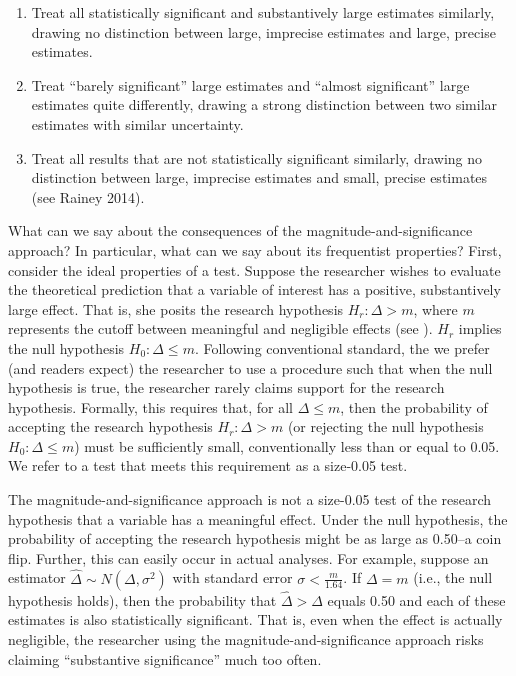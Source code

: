 \documentclass[12pt]{article}
\begin{document}
\begin{enumerate}
\item Treat all statistically significant and substantively large estimates similarly, drawing no distinction between large, imprecise estimates and large, precise estimates.
\item Treat ``barely significant'' large estimates and ``almost significant'' large estimates quite differently, drawing a strong distinction between two similar estimates with similar uncertainty.
\item Treat all results that are not statistically significant similarly, drawing no distinction between large, imprecise estimates and small, precise estimates (see Rainey 2014).
\end{enumerate}

What can we say about the consequences of the magnitude-and-significance approach? In particular, what can we say about its frequentist properties? First, consider the ideal properties of a test. Suppose the researcher wishes to evaluate the theoretical prediction that a variable of interest has a positive, substantively large effect. That is, she posits the research hypothesis $H_r: \Delta > m$, where $m$ represents the cutoff between meaningful and negligible effects (see \citealt{Rainey2014a}). $H_r$ implies the null hypothesis $H_0: \Delta \leq m$. Following conventional standard, the we prefer (and readers expect) the researcher to use a procedure such that when the null hypothesis is true, the researcher rarely claims support for the research hypothesis. Formally, this requires that, for all $\Delta \leq m$, then the probability of accepting the research hypothesis $H_r: \Delta > m$ (or rejecting the null hypothesis $H_0: \Delta \leq m$) must be sufficiently small, conventionally less than or equal to 0.05. We refer to a test that meets this requirement as a size-0.05 test.

The magnitude-and-significance approach is not a size-0.05 test of the research hypothesis that a variable has a meaningful effect. Under the null hypothesis, the probability of accepting the research hypothesis might be as large as 0.50--a coin flip. Further, this can easily occur in actual analyses. For example, suppose an estimator $\hat{\Delta} \sim N(\Delta, \sigma^2)$ with standard error $\sigma < \frac{m}{1.64}$. If $\Delta = m$ (i.e., the null hypothesis holds), then the probability that $\hat{\Delta} > \Delta$ equals 0.50 and each of these estimates is also statistically significant. That is, even when the effect is actually negligible, the researcher using the magnitude-and-significance approach risks claiming ``substantive significance'' much too often.
\end{document}
